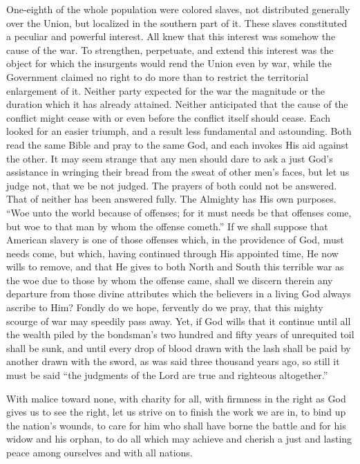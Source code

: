 \documentclass[a4paper]{amsbook}
\begin{document}
One-eighth of the whole population were colored slaves, not distributed generally over the Union, but localized in the southern part of it. These slaves constituted a peculiar and powerful interest. All knew that this interest was somehow the cause of the war. To strengthen, perpetuate, and extend this interest was the object for which the insurgents would rend the Union even by war, while the Government claimed no right to do more than to restrict the territorial enlargement of it. Neither party expected for the war the magnitude or the duration which it has already attained. Neither anticipated that the cause of the conflict might cease with or even before the conflict itself should cease. Each looked for an easier triumph, and a result less fundamental and astounding. Both read the same Bible and pray to the same God, and each invokes His aid against the other. It may seem strange that any men should dare to ask a just God's assistance in wringing their bread from the sweat of other men's faces, but let us judge not, that we be not judged. The prayers of both could not be answered. That of neither has been answered fully. The Almighty has His own purposes. “Woe unto the world because of offenses; for it must needs be that offenses come, but woe to that man by whom the offense cometh.” If we shall suppose that American slavery is one of those offenses which, in the providence of God, must needs come, but which, having continued through His appointed time, He now wills to remove, and that He gives to both North and South this terrible war as the woe due to those by whom the offense came, shall we discern therein any departure from those divine attributes which the believers in a living God always ascribe to Him? Fondly do we hope, fervently do we pray, that this mighty scourge of war may speedily pass away. Yet, if God wills that it continue until all the wealth piled by the bondsman's two hundred and fifty years of unrequited toil shall be sunk, and until every drop of blood drawn with the lash shall be paid by another drawn with the sword, as was said three thousand years ago, so still it must be said “the judgments of the Lord are true and righteous altogether.”

With malice toward none, with charity for all, with firmness in the right as God gives us to see the right, let us strive on to finish the work we are in, to bind up the nation's wounds, to care for him who shall have borne the battle and for his widow and his orphan, to do all which may achieve and cherish a just and lasting peace among ourselves and with all nations.
\end{document}
